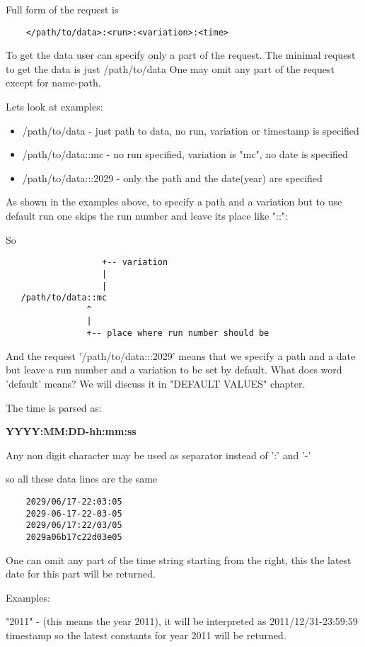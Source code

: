 \documentclass{article}
\begin{document}
Full form of the request is
\begin{verbatim}
    </path/to/data>:<run>:<variation>:<time>
\end{verbatim}

To get the data user can specify only a part of the request.
The minimal request to get the data is just /path/to/data
One may omit any part of the request except for name-path.

Lets look at examples:
\begin{itemize}
  \item /path/to/data - just path to data, no run, variation or timestamp is specified
  \item /path/to/data::mc - no run specified, variation is "mc", no date is specified
  \item /path/to/data:::2029 - only the path and the date(year) are specified
\end{itemize}

As shown in the examples above, to specify a path and a variation but to use default run
 one skips the run number and leave its place like "::":

So
\begin{verbatim}
                   +-- variation
                   |
                   |
   /path/to/data::mc
                ^
                |
                +-- place where run number should be
\end{verbatim}


And the request '/path/to/data:::2029' means that we specify a path and a date
but leave a run number and a variation to be set by default.
What does word 'default' means? We will discuss it in "DEFAULT VALUES" chapter.

The time is parsed as:

    \textbf{YYYY:MM:DD-hh:mm:ss}

Any non digit character may be used as separator instead of ':' and '-'

so all these data lines are the same
\begin{verbatim}
    2029/06/17-22:03:05
    2029-06-17-22-03-05
    2029/06/17:22/03/05
    2029a06b17c22d03e05
\end{verbatim}

One can omit any part of the time string starting from the right, this the latest date for this
part will be returned.

Examples:

"2011" - (this means the year 2011), it will be interpreted as 2011/12/31-23:59:59 timestamp
so the latest constants for year 2011 will be returned.
\end{document}
